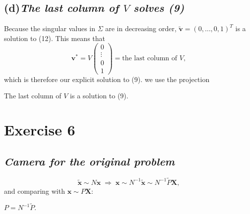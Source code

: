 \documentclass[11pt,a4paper]{article}
\newcommand{\vb}[1]{\mathbf{#1}}
\newcommand{\vect}[1]{
    \begin{pmatrix}#1
\end{pmatrix}}
\newcommand{\exercise}[1]{
\section*{Exercise #1}}
\newcommand{\task}[2]{
\subsection*{#1\quad\normalfont\textit{#2}}}
\begin{document}
\task{(d)}{The last column of $V$ solves (9)}

Because the singular values in $\Sigma$ are in decreasing order,
$\tilde{\vb{v}} = (0,\dots,0,1)^T$
is a solution to (12). This means that
\[
    \vb{v}^* = V\vect{0\\ \vdots\\ 0\\ 1} = \text{the last column of } V,
\]
which is therefore our explicit solution to (9).
we use the projection

\begin{answer}
    The last column of $V$ is a solution to (9).
\end{answer}

\exercise{6}

\task{}{Camera for the original problem}

\[
    \tilde{\vb{x}} \sim N\vb{x}
    \;\Longrightarrow\;
    \vb{x} \sim N^{-1}\tilde{\vb{x}} \sim N^{-1}\tilde{P}\vb{X},
\]
and comparing with $\vb{x} \sim P\vb{X}$:
\begin{answer}
    $P = N^{-1}\tilde{P}$.
\end{answer}
\end{document}
